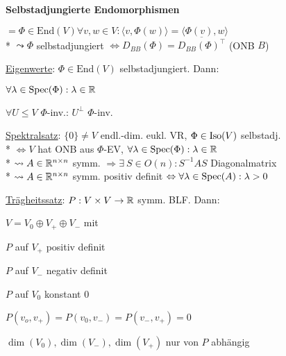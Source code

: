 \textbf{Selbstadjungierte Endomorphismen}
\begin{items}
	\item \( = \Phi \in \text{End}(V) \forall v,w \in V: \langle v, \Phi(w) \rangle = \langle \Phi(v),w \rangle \)
		\\*
		\( \leadsto \Phi \) selbstadjungiert \( \Leftrightarrow D_{BB}(\Phi) = \overline{D_{BB}(\Phi)^\top } \) (ONB \( B \))
	\item \underline{Eigenwerte}: \( \Phi \in \text{End}(V) \) selbstadjungiert. Dann:
		\begin{enumeration}
			\item \( \forall \lambda \in \text{Spec}(\Phi): \lambda \in \mathbb{R} \) 
			\item \( \forall U \leq V \) \( \Phi \)-inv.: \( U^\perp \) \( \Phi \)-inv.
		\end{enumeration}
	\item \underline{Spektralsatz}: \( \{ 0 \} \neq V \) endl.-dim. eukl. VR, \( \Phi \in \text{Iso}(V) \) selbstadj.
		\\*
		\( \Leftrightarrow V \) hat ONB aus \( \Phi \)-EV, \( \forall \lambda \in \text{Spec}(\Phi): \lambda \in \mathbb{R} \)
		\\*
		\( \leadsto A \in \mathbb{R}^{n \times n} \) symm. \( \Rightarrow \exists \ S \in O(n): S^{-1}AS \) Diagonalmatrix
		\\*
		\( \leadsto A \in \mathbb{R}^{n \times n} \) symm. positiv definit \( \Leftrightarrow \forall \lambda \in \text{Spec}(A): \lambda > 0 \)
	\item \underline{Trägheitssatz}: \( P: V \times V \to \mathbb{R} \) symm. BLF. Dann:
		\begin{enumeration}
			\item \( V = V_0 \oplus V_+ \oplus V_-  \) mit
			\begin{enumeration}
				\item \( P \) auf \( V_+ \) positiv definit
				\item \( P \) auf \( V_- \) negativ definit
				\item \( P \) auf \( V_0 \) konstant \( 0 \)
				\item \( P(v_o, v_+) = P(v_0,v_-)=P(v_-,v_+)=0 \)
			\end{enumeration}
			\item \( \dim(V_0), \dim(V_-), \dim(V_+) \) nur von \( P \) abhängig
		\end{enumeration}
\end{items}


